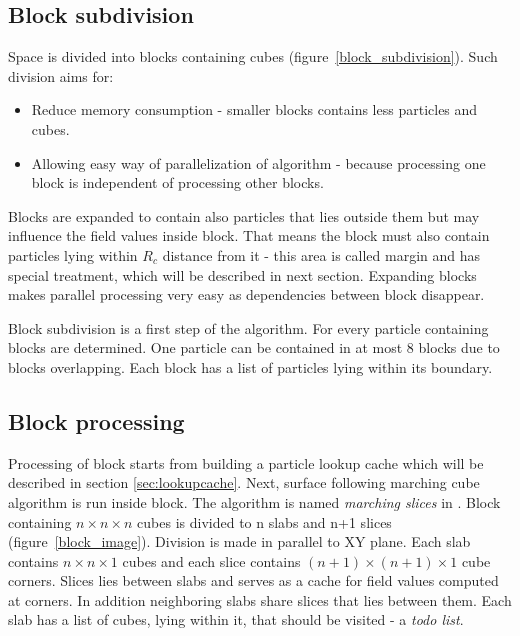 
\subsection{Block subdivision} \label{sec:block_subdivision}
Space is divided into blocks containing cubes (figure~\ref{block_subdivision}). Such division aims for:
\begin{itemize}
\item Reduce memory consumption - smaller blocks contains less particles and cubes. 
\item Allowing easy way of parallelization of algorithm - because processing one block is independent of processing other blocks. 
\end{itemize}
Blocks are expanded to contain also particles that lies outside them but may influence the field values inside block. That means the block must also contain particles lying within $R_c$ distance from it - this area is called margin and has special treatment, which will be described in next section. Expanding blocks makes parallel processing very easy as dependencies between block disappear.


Block subdivision is a first step of the algorithm. For every particle containing blocks are determined. One particle can be contained in at most 8 blocks due to blocks overlapping. Each block has a list of particles lying within its boundary. 

\subsection{Block processing} \label{sec:block_processing}
Processing of block starts from building a particle lookup cache which will be described in section \ref{sec:lookupcache}. Next, surface following marching cube algorithm is run inside block. The algorithm is named \textit{marching slices} in \cite{RosenbergBirdwell2008}. Block containing $n \times n \times n$ cubes is divided to n slabs and n+1 slices (figure~\ref{block_image}). Division is made in parallel to XY plane. Each slab contains $n \times n \times 1$ cubes and each slice contains $(n+1) \times (n+1) \times 1$ cube corners. Slices lies between slabs and serves as a cache for field values computed at corners. In addition neighboring slabs share slices that lies between them. Each slab has a list of cubes, lying within it, that should be visited - a \textit{todo list}.

